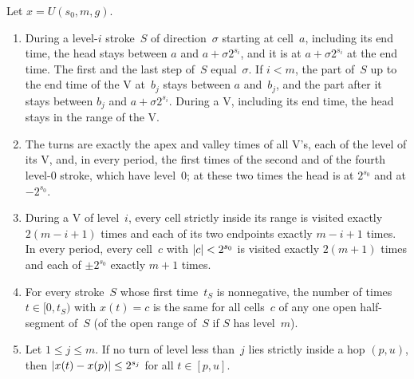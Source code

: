 \begin{lemma}[Structure of $U$]\label{lem:dep-structure}
\notformalized
Let $x=U(s_0,m,g)$.
\begin{enumerate}[label=(\alph*)]
\item During a level-$i$ stroke~$S$ of direction~$\sigma$ starting at cell~$a$, including its end time, the head
stays between $a$ and $a+\sigma2^{s_i}$, and it is at $a+\sigma2^{s_i}$ at the end time. The first and the last step
of~$S$ equal~$\sigma$. If $i<m$, the part of~$S$ up to the end time of the V at~$b_j$ stays between $a$ and~$b_j$, and
the part after it stays between $b_j$ and $a+\sigma2^{s_i}$. During a V, including its end time, the head stays in
the range of the V.
\item The turns are exactly the apex and valley times of all V's, each of the level of its V, and, in every period,
the first times of the second and of the fourth level-$0$ stroke, which have level~$0$; at these two times the head
is at $2^{s_0}$ and at $-2^{s_0}$.
\item During a V of level~$i$, every cell strictly inside its range is visited exactly $2(m-i+1)$ times and each of
its two endpoints exactly $m-i+1$ times. In every period, every cell~$c$ with $\lvert c \rvert<2^{s_0}$ is visited exactly
$2(m+1)$ times and each of $\pm2^{s_0}$ exactly $m+1$ times.
\item For every stroke~$S$ whose first time~$t_S$ is nonnegative, the number of times $t\in[0,t_S)$ with $x(t)=c$
is the same for all cells~$c$ of any one open half-segment of~$S$ (of the open range of~$S$ if $S$ has level~$m$).
\item Let $1\le j\le m$. If no turn of level less than~$j$ lies strictly inside a hop $(p,u)$, then
$\lvert x(t)-x(p) \rvert\le2^{s_j}$ for all $t\in[p,u]$.
\end{enumerate}
\end{lemma}

